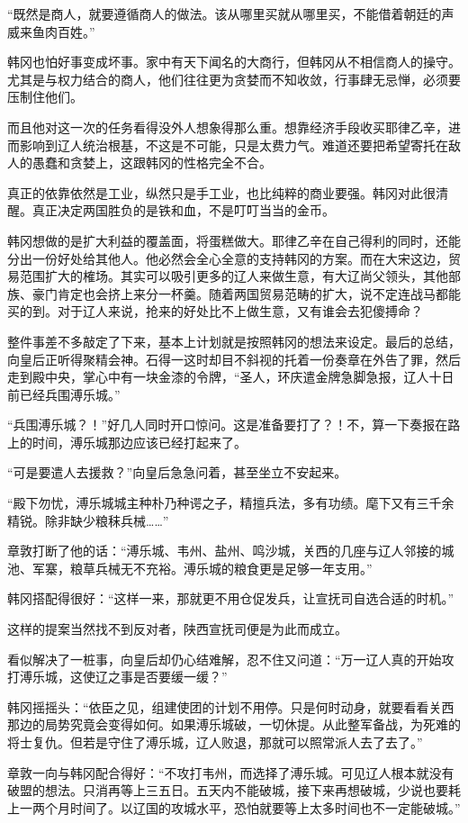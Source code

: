 “既然是商人，就要遵循商人的做法。该从哪里买就从哪里买，不能借着朝廷的声威来鱼肉百姓。”

韩冈也怕好事变成坏事。家中有天下闻名的大商行，但韩冈从不相信商人的操守。尤其是与权力结合的商人，他们往往更为贪婪而不知收敛，行事肆无忌惮，必须要压制住他们。

而且他对这一次的任务看得没外人想象得那么重。想靠经济手段收买耶律乙辛，进而影响到辽人统治根基，不这是不可能，只是太费力气。难道还要把希望寄托在敌人的愚蠢和贪婪上，这跟韩冈的性格完全不合。

真正的依靠依然是工业，纵然只是手工业，也比纯粹的商业要强。韩冈对此很清醒。真正决定两国胜负的是铁和血，不是叮叮当当的金币。

韩冈想做的是扩大利益的覆盖面，将蛋糕做大。耶律乙辛在自己得利的同时，还能分出一份好处给其他人。他必然会全心全意的支持韩冈的方案。而在大宋这边，贸易范围扩大的榷场。其实可以吸引更多的辽人来做生意，有大辽尚父领头，其他部族、豪门肯定也会挤上来分一杯羹。随着两国贸易范畴的扩大，说不定连战马都能买的到。对于辽人来说，抢来的好处比不上做生意，又有谁会去犯傻搏命？

整件事差不多敲定了下来，基本上计划就是按照韩冈的想法来设定。最后的总结，向皇后正听得聚精会神。石得一这时却目不斜视的托着一份奏章在外告了罪，然后走到殿中央，掌心中有一块金漆的令牌，“圣人，环庆遣金牌急脚急报，辽人十日前已经兵围溥乐城。”

“兵围溥乐城？！”好几人同时开口惊问。这是准备要打了？！不，算一下奏报在路上的时间，溥乐城那边应该已经打起来了。

“可是要遣人去援救？”向皇后急急问着，甚至坐立不安起来。

“殿下勿忧，溥乐城城主种朴乃种谔之子，精擅兵法，多有功绩。麾下又有三千余精锐。除非缺少粮秣兵械……”

章敦打断了他的话：“溥乐城、韦州、盐州、鸣沙城，关西的几座与辽人邻接的城池、军寨，粮草兵械无不充裕。溥乐城的粮食更是足够一年支用。”

韩冈搭配得很好：“这样一来，那就更不用仓促发兵，让宣抚司自选合适的时机。”

这样的提案当然找不到反对者，陕西宣抚司便是为此而成立。

看似解决了一桩事，向皇后却仍心结难解，忍不住又问道：“万一辽人真的开始攻打溥乐城，这使辽之事是否要缓一缓？”

韩冈摇摇头：“依臣之见，组建使团的计划不用停。只是何时动身，就要看看关西那边的局势究竟会变得如何。如果溥乐城破，一切休提。从此整军备战，为死难的将士复仇。但若是守住了溥乐城，辽人败退，那就可以照常派人去了去了。”

章敦一向与韩冈配合得好：“不攻打韦州，而选择了溥乐城。可见辽人根本就没有破盟的想法。只消再等上三五日。五天内不能破城，接下来再想破城，少说也要耗上一两个月时间了。以辽国的攻城水平，恐怕就要等上太多时间也不一定能破城。”

